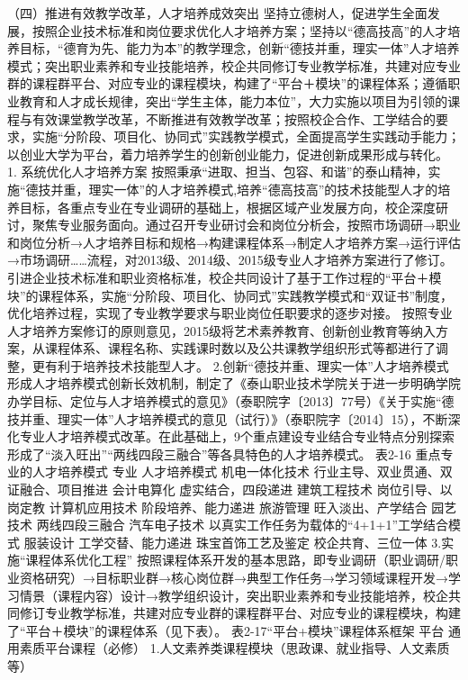 （四）推进有效教学改革，人才培养成效突出
坚持立德树人，促进学生全面发展，按照企业技术标准和岗位要求优化人才培养方案；坚持以“德高技高”的人才培养目标，“德育为先、能力为本”的教学理念，创新“德技并重，理实一体”人才培养模式；突出职业素养和专业技能培养，校企共同修订专业教学标准，共建对应专业群的课程群平台、对应专业的课程模块，构建了“平台＋模块”的课程体系；遵循职业教育和人才成长规律，突出“学生主体，能力本位”，大力实施以项目为引领的课程与有效课堂教学改革，不断推进有效教学改革；按照校企合作、工学结合的要求，实施“分阶段、项目化、协同式”实践教学模式，全面提高学生实践动手能力；以创业大学为平台，着力培养学生的创新创业能力，促进创新成果形成与转化。
1. 系统优化人才培养方案 
按照秉承“进取、担当、包容、和谐”的泰山精神，实施“德技并重，理实一体”的人才培养模式,培养“德高技高”的技术技能型人才的培养目标，各重点专业在专业调研的基础上，根据区域产业发展方向，校企深度研讨，聚焦专业服务面向。通过召开专业研讨会和岗位分析会，按照市场调研→职业和岗位分析→人才培养目标和规格→构建课程体系→制定人才培养方案→运行评估→市场调研……流程，对2013级、2014级、2015级专业人才培养方案进行了修订。引进企业技术标准和职业资格标准，校企共同设计了基于工作过程的“平台＋模块”的课程体系，实施“分阶段、项目化、协同式”实践教学模式和“双证书”制度，优化培养过程，实现了专业教学要求与职业岗位任职要求的逐步对接。
按照专业人才培养方案修订的原则意见，2015级将艺术素养教育、创新创业教育等纳入方案，从课程体系、课程名称、实践课时数以及公共课教学组织形式等都进行了调整，更有利于培养技术技能型人才。
2.创新“德技并重、理实一体”人才培养模式
形成人才培养模式创新长效机制，制定了《泰山职业技术学院关于进一步明确学院办学目标、定位与人才培养模式的意见》（泰职院字〔2013〕77号）《关于实施“德技并重、理实一体”人才培养模式的意见（试行）》（泰职院字〔2014〕15），不断深化专业人才培养模式改革。在此基础上，9个重点建设专业结合专业特点分别探索形成了“淡入旺出”“两线四段三融合”等各具特色的人才培养模式。
表2-16 重点专业的人才培养模式
专业
人才培养模式
机电一体化技术
行业主导、双业贯通、双证融合、项目推进
会计电算化
虚实结合，四段递进
建筑工程技术
岗位引导、以岗定教
计算机应用技术
阶段培养、能力递进
旅游管理
旺入淡出、产学结合
园艺技术
两线四段三融合
汽车电子技术
以真实工作任务为载体的“4+1+1”工学结合模式
服装设计
工学交替、能力递进
珠宝首饰工艺及鉴定
校企共育、三位一体
3.实施“课程体系优化工程”
按照课程体系开发的基本思路，即专业调研（职业调研/职业资格研究）→目标职业群→核心岗位群→典型工作任务→学习领域课程开发→学习情景（课程内容）设计→教学组织设计，突出职业素养和专业技能培养，校企共同修订专业教学标准，共建对应专业群的课程群平台、对应专业的课程模块，构建了“平台＋模块”的课程体系（见下表）。
表2-17“平台+模块”课程体系框架
平台
通用素质平台课程（必修）
1.人文素养类课程模块（思政课、就业指导、人文素质等）


